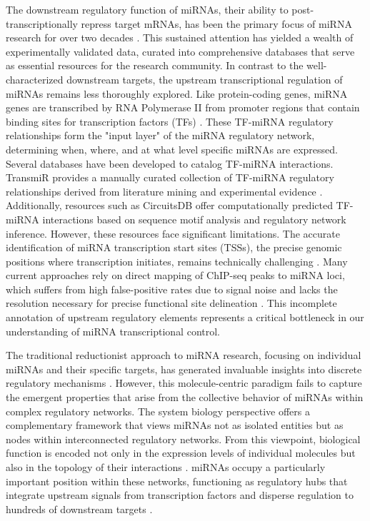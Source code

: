 The downstream regulatory function of miRNAs, their ability to post-transcriptionally repress target mRNAs, has been the primary focus of miRNA research for over two decades \cite{georgaki2014microtss}. This sustained attention has yielded a wealth of experimentally validated data, curated into comprehensive databases that serve as essential resources for the research community. In contrast to the well-characterized downstream targets, the upstream transcriptional regulation of miRNAs remains less thoroughly explored. Like protein-coding genes, miRNA genes are transcribed by RNA Polymerase II from promoter regions that contain binding sites for transcription factors (TFs) \cite{li2020primirts}. These TF-miRNA regulatory relationships form the "input layer" of the miRNA regulatory network, determining when, where, and at what level specific miRNAs are expressed. Several databases have been developed to catalog TF-miRNA interactions. TransmiR provides a manually curated collection of TF-miRNA regulatory relationships derived from literature mining and experimental evidence \cite{suzuki2002dbtss}. Additionally, resources such as CircuitsDB \cite{mundade2014role} offer computationally predicted TF-miRNA interactions based on sequence motif analysis and regulatory network inference. However, these resources face significant limitations. The accurate identification of miRNA transcription start sites (TSSs), the precise genomic positions where transcription initiates, remains technically challenging \cite{grigoria2022deeptss}. Many current approaches rely on direct mapping of ChIP-seq peaks to miRNA loci, which suffers from high false-positive rates due to signal noise and lacks the resolution necessary for precise functional site delineation \cite{wingende2008transfac}. This incomplete annotation of upstream regulatory elements represents a critical bottleneck in our understanding of miRNA transcriptional control.

The traditional reductionist approach to miRNA research, focusing on individual miRNAs and their specific targets, has generated invaluable insights into discrete regulatory mechanisms \cite{kozomara2019mirbase}. However, this molecule-centric paradigm fails to capture the emergent properties that arise from the collective behavior of miRNAs within complex regulatory networks. The system biology perspective offers a complementary framework that views miRNAs not as isolated entities but as nodes within interconnected regulatory networks. From this viewpoint, biological function is encoded not only in the expression levels of individual molecules but also in the topology of their interactions \cite{wingende2008transfac}. miRNAs occupy a particularly important position within these networks, functioning as regulatory hubs that integrate upstream signals from transcription factors and disperse regulation to hundreds of downstream targets \cite{zou2024chip}.

